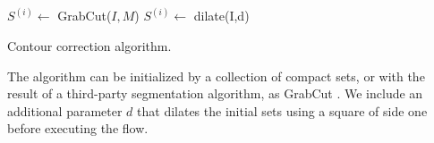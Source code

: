 \documentclass[runningheads]{llncs}
\begin{document}
\begin{algorithm}[H]
 
 \BlankLine

 $S^{(i)} \longleftarrow$ GrabCut($I,M$)\;
 $S^{(i)} \longleftarrow $ dilate(I,d)\; 
 \label{alg:contour-correction} 
 \caption{Contour correction algorithm.}
\end{algorithm}	

The algorithm can be initialized by a collection of compact sets, or with the result of a third-party segmentation algorithm, as GrabCut \cite{rother04grabcut}. We include an additional parameter $d$ that dilates the initial sets using a square of side one before executing the flow.
	
\end{document}
